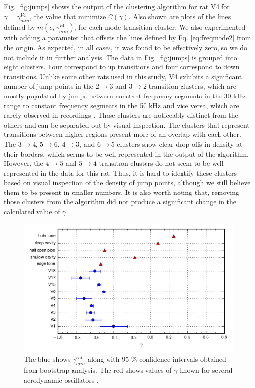 \documentclass[superscriptaddress, twocolumn, prl]{revtex4}
\begin{document}
Fig. \ref{fig:jumps} shows the output of the clustering algorithm for rat V4 for $\gamma=\gamma_{min}^{V4}$, the value that minimize $C\left(\gamma \right)$. Also shown are plots of the lines defined by $m\left(c,\gamma_{min}^{V4}\right)$, for each mode transition cluster. We also experimented with adding a parameter that offsets the lines defined by Eq. \ref{eq:freqmode2} from the origin. As expected, in all cases, it was found to be effectively zero, so we do not include it in further analysis. The data in Fig. \ref{fig:jumps} is grouped into eight clusters. Four correspond to up transitions and four correspond to down transitions. Unlike some other rats used in this study, V4 exhibits a significant number of jump points in the $2\rightarrow3$ and $3\rightarrow2$ transition clusters, which are mostly populated by jumps between constant frequency segments in the 30 kHz range to constant frequency segments in the 50 kHz and vice versa, which are rarely observed in recordings \cite{Wright2010}. These clusters are noticeably distinct from the others and can be separated out by visual inspection. The clusters that represent transitions between higher regions present more of an overlap with each other. The $3\rightarrow4$, $5\rightarrow6$, $4\rightarrow3$, and $6\rightarrow5$ clusters show clear drop offs in density at their borders, which seems to be well represented in the output of the algorithm. However, the $4\rightarrow5$ and $5\rightarrow4$ transition clusters do not seem to be well represented in the data for this rat. Thus, it is hard to identify these clusters based on visual inspection of the density of jump points, although we still believe them to be present in smaller numbers. It is also worth noting that, removing those clusters from the algorithm did not produce a significant change in the calculated value of $\gamma$. 
\begin{figure}[!ht]
\centering
\includegraphics[width=\columnwidth]{theta_error_minus.png}
\caption{\label{fig:gamma_error} The blue shows $\gamma_{min}^{rat}$ along with 95 \% confidence intervals obtained from bootstrap analysis. The red shows values of $\gamma$ known for several aerodynamic oscillators \cite{Howe2008}.}
\end{figure}
\end{document}

